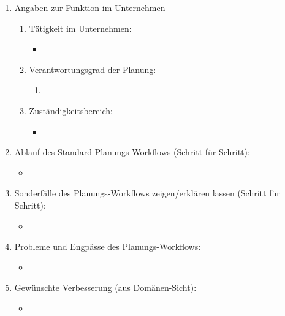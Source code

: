 \documentclass[Bachelorarbeit.tex]{subfiles}
\begin{document}
\begin{enumerate}
	\item Angaben zur Funktion im Unternehmen
	\begin{enumerate}
		\item Tätigkeit im Unternehmen:
		\begin{itemize}
			\item[] 
		\end{itemize}
		\item Verantwortungsgrad der Planung:
		\begin{enumerate}
			\item[] 
		\end{enumerate}
		\item Zuständigkeitsbereich:
		\begin{itemize}
			\item[] 
		\end{itemize}
	\end{enumerate}
	\item Ablauf des Standard Planungs-Workflows (Schritt für Schritt):
	\begin{itemize}
		\item[] 
	\end{itemize}
	\item Sonderfälle des Planungs-Workflows zeigen/erklären lassen (Schritt für Schritt):
	\begin{itemize}
		\item[] 
	\end{itemize}
	\item Probleme und Engpässe des Planungs-Workflows:
	\begin{itemize}
		\item[] 
	\end{itemize}
	\item Gewünschte Verbesserung (aus Domänen-Sicht):
	\begin{itemize}
		\item[] 
	\end{itemize}
\end{enumerate}
\newpage
\end{document}
